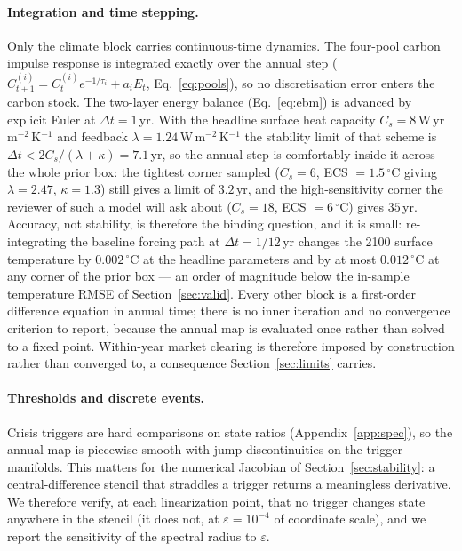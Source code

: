 \documentclass[12pt,a4paper]{article}
\newcommand{\degC}{$^{\circ}$C}
\begin{document}
\paragraph{Integration and time stepping.} Only the climate block carries continuous-time
dynamics. The four-pool carbon impulse response is integrated exactly over the annual step
($C^{(i)}_{t+1}=C^{(i)}_t e^{-1/\tau_i}+a_i E_t$, Eq.~\ref{eq:pools}), so no discretisation
error enters the carbon stock. The two-layer energy balance (Eq.~\ref{eq:ebm}) is advanced by
explicit Euler at $\Delta t = 1$\,yr. With the headline surface heat capacity
$C_s = 8$\,W\,yr\,m$^{-2}$\,K$^{-1}$ and feedback $\lambda = 1.24$\,W\,m$^{-2}$\,K$^{-1}$ the
stability limit of that scheme is $\Delta t < 2C_s/(\lambda+\kappa) = 7.1$\,yr, so the annual
step is comfortably inside it across the whole prior box: the tightest corner sampled
($C_s = 6$, ECS $=1.5$\,\degC{} giving $\lambda=2.47$, $\kappa=1.3$) still gives a limit of
$3.2$\,yr, and the high-sensitivity corner the reviewer of such a model will ask about
($C_s=18$, ECS $=6$\,\degC) gives $35$\,yr. Accuracy, not stability, is therefore the binding
question, and it is small: re-integrating the baseline forcing path at $\Delta t = 1/12$\,yr
changes the 2100 surface temperature by $0.002$\,\degC{} at the headline parameters and by at
most $0.012$\,\degC{} at any corner of the prior box --- an order of magnitude below the
in-sample temperature RMSE of Section~\ref{sec:valid}. Every other block is a first-order difference equation in annual
time; there is no inner iteration and no convergence criterion to report, because the annual
map is evaluated once rather than solved to a fixed point. Within-year market clearing is
therefore imposed by construction rather than converged to, a consequence
Section~\ref{sec:limits} carries.

\paragraph{Thresholds and discrete events.} Crisis triggers are hard comparisons on state
ratios (Appendix~\ref{app:spec}), so the annual map is piecewise smooth with jump
discontinuities on the trigger manifolds. This matters for the numerical Jacobian of
Section~\ref{sec:stability}: a central-difference stencil that straddles a trigger returns a
meaningless derivative. We therefore verify, at each linearization point, that no trigger
changes state anywhere in the stencil (it does not, at $\varepsilon = 10^{-4}$ of coordinate
scale), and we report the sensitivity of the spectral radius to $\varepsilon$.
\end{document}
